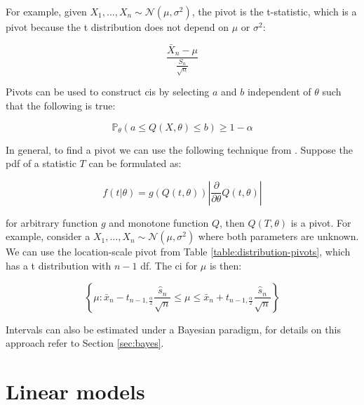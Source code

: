 \documentclass{report}
\renewcommand{\arraystretch}{1.5}
\begin{document}
\renewcommand{\arraystretch}{1.5}

For example, given $X_1, \dots, X_n \sim \mathcal{N}(\mu, \sigma^2)$, the pivot is the t-statistic, which is a pivot because the t distribution does not depend on $\mu$ or $\sigma^2$:

\begin{equation}\label{eq:t-statistic}
    \frac{\bar{X}_n - \mu}{\frac{S_n}{\sqrt{n}}}
\end{equation}

Pivots can be used to construct \glspl{ci} by selecting $a$ and $b$ independent of $\theta$ such that the following is true:

\begin{equation}\label{eq:pivot-confidence-interval}
    \mathbb{P}_\theta\left(a \leq Q(X,\theta) \leq b\right) \geq 1 - \alpha 
\end{equation}

In general, to find a pivot we can use the following technique from \cite[Chapter~9.2.2]{casella_statistical_2002}. Suppose the \gls{pdf} of a statistic $T$ can be formulated as:

\begin{equation}\label{eq:pivot-pdf}
    f(t|\theta) = g(Q(t, \theta)) \left|\frac{\partial}{\partial\theta} Q(t, \theta)\right|
\end{equation}

for arbitrary function $g$ and monotone function $Q$, then $Q(T, \theta)$ is a pivot. For example, consider a $X_1, \dots, X_n \sim \mathcal{N}(\mu, \sigma^2)$ where both parameters are unknown. We can use the location-scale pivot from Table \ref{table:distribution-pivots}, which has a t distribution with $n - 1$ \gls{df}. The \gls{ci} for $\mu$ is then:

\begin{equation}\label{eq:normal-ci}
    \left\{\mu \colon \bar{x}_n - t_{n-1,\frac{\alpha}{2}} \frac{\hat{s}_n}{\sqrt{n}} \leq \mu \leq \bar{x}_n + t_{n-1,\frac{\alpha}{2}} \frac{\hat{s}_n}{\sqrt{n}}\right\}
\end{equation}

Intervals can also be estimated under a Bayesian paradigm, for details on this approach refer to Section \ref{sec:bayes}. 

\section{Linear models}\label{sec:tools-ols}
\end{document}
